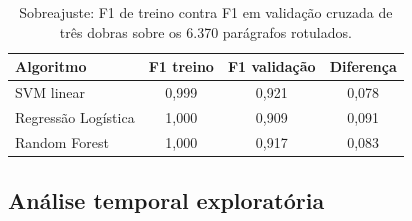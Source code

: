 \documentclass[fleqn,10pt]{SelfArx}
\begin{document}
\begin{table}[hbt]
\caption{Sobreajuste: F1 de treino contra F1 em validação cruzada de três dobras sobre os 6.370 parágrafos rotulados.}
\label{tab:sobreajuste}
\centering
\small
\begin{tabular}{lccc}
\toprule
Algoritmo & F1 treino & F1 validação & Diferença \\
\midrule
SVM linear & 0,999 & 0,921 & 0,078 \\
Regressão Logística & 1,000 & 0,909 & 0,091 \\
Random Forest & 1,000 & 0,917 & 0,083 \\
\bottomrule
\end{tabular}
\end{table}

\subsection{Análise temporal exploratória}
\label{sec:temporal}
\end{document}
